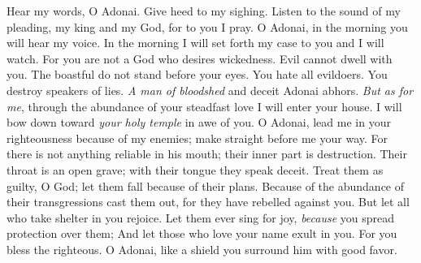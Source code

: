 \begin{biblechapter} %
 Hear my words, O Adonai. 
Give heed to my sighing.
\verse Listen to the sound of my pleading, my king and my God, 
for to you I pray.
\verse O Adonai, in the morning you will hear my voice. 
In the morning I will set forth my case to you and I will watch.
\verse For you are not a God who desires wickedness. 
Evil cannot dwell with you.
\verse The boastful do not stand before your eyes. 
You hate all evildoers.
\verse You destroy speakers of lies. 
\textit{A man of bloodshed} and deceit Adonai abhors.
\verse \textit{But as for me}, through the abundance of your steadfast love 
I will enter your house. 
I will bow down toward \textit{your holy temple} in awe of you.
\verse O Adonai, lead me in your righteousness because of my enemies; 
make straight before me your way.
\verse For there is not anything reliable in his mouth; 
their inner part is destruction. 
Their throat is an open grave; 
with their tongue they speak deceit.
\verse Treat them as guilty, O God; 
let them fall because of their plans. 
Because of the abundance of their transgressions cast them out, 
for they have rebelled against you.
\verse But let all who take shelter in you rejoice. 
Let them ever sing for joy, 
\textit{because} you spread protection over them; 
And let those who love your name exult in you.
\verse For you bless the righteous. 
O Adonai, like a shield you surround him with good favor.
\end{biblechapter}

